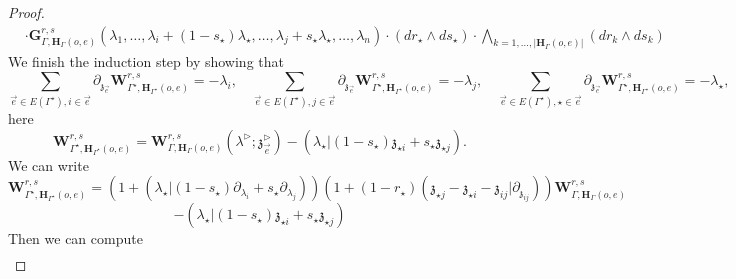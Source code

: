 \documentclass[11pt]{amsart}
\theoremstyle{definition}
\theoremstyle{remark}
\numberwithin{equation}{section}
\begin{document}
\begin{proof}
\begin{align*}
   &\cdot  \mathbf{G}^{r,s}_{\Gamma,\mathbf{H}_{\Gamma}(o,e)}(\lambda_1,\dots,\lambda_i+(1-s_{\star})\lambda_{\star},\dots,\lambda_j+s_{\star}\lambda_{\star},\dots,\lambda_{n})\cdot (dr_{\star}\wedge ds_{\star})\cdot \bigwedge_{k=1,\dots,|\mathbf{H}_{\Gamma}(o,e)|} (dr_k\wedge ds_k)
  \end{align*}
  We finish the induction step by showing that
 $$
 \sum_{\vec{e}\in E(\Gamma^{\star}),i\in \vec{e}} \partial_{\mathfrak{z}_{\vec{e}}}  \mathbf{W}^{r,s}_{\Gamma^{\star},\mathbf{H}_{\Gamma^{\star}}(o,e)}=-\lambda_i,\quad  \sum_{\vec{e}\in E(\Gamma^{\star}),j\in \vec{e}} \partial_{\mathfrak{z}_{\vec{e}}}  \mathbf{W}^{r,s}_{\Gamma^{\star},\mathbf{H}_{\Gamma^{\star}}(o,e)}=-\lambda_j,\quad  \sum_{\vec{e}\in E(\Gamma^{\star}),\star\in \vec{e}} \partial_{\mathfrak{z}_{\vec{e}}}  \mathbf{W}^{r,s}_{\Gamma^{\star},\mathbf{H}_{\Gamma^{\star}}(o,e)}=-\lambda_{\star},
$$
here
$$
\mathbf{W}^{r,s}_{\Gamma^{\star},\mathbf{H}_{\Gamma^{\star}}(o,e)} = \mathbf{W}^{r,s}_{\Gamma,\mathbf{H}_{\Gamma}(o,e)}(\lambda^\triangleright;\mathfrak{z}^\triangleright_{\vec{e}}) -\left(\lambda_{\star}|(1-s_{\star})\mathfrak{z}_{\star i}+s_{\star}\mathfrak{z}_{\star j}\right).
$$
  We can write
  $$
  \mathbf{W}^{r,s}_{\Gamma^{\star},\mathbf{H}_{\Gamma^{\star}}(o,e)}=\left(1+(\lambda_{\star}|(1-s_{\star})\partial_{\lambda_i}+s_{\star}\partial_{\lambda_j})\right)\left(1+(1-r_{\star})(\mathfrak{z}_{\star j}-\mathfrak{z}_{\star i}-\mathfrak{z}_{ij}|\partial_{\mathfrak{z}_{ij}})\right)\mathbf{W}^{r,s}_{\Gamma,\mathbf{H}_{\Gamma}(o,e)}
  $$
  $$
  -\left(\lambda_{\star}|(1-s_{\star})\mathfrak{z}_{\star i}+s_{\star}\mathfrak{z}_{\star j}\right)
  $$
  Then we can compute
    \begin{align*}

\end{align*}
\end{proof}
\end{document}
